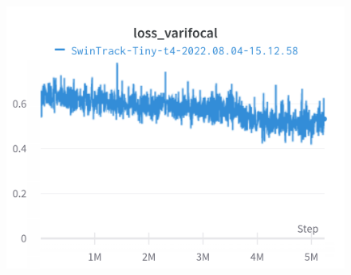 \documentclass{article}
\begin{document}
\begin{figure}[h]
\includegraphics[width=\linewidth]{charts/Section-2-Panel-9-8yjlirrqx}
\caption{}
\endminipage
\end{figure}
\end{document}
